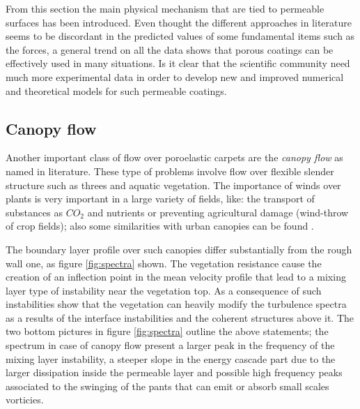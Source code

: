 From this section the main physical mechanism that are tied to permeable surfaces has been introduced.
Even thought the different approaches in literature seems to be discordant in the predicted values of some fundamental items such as the forces, a general trend on all the data shows that porous coatings can be effectively used in many situations.
Is it clear that the scientific community need much more experimental data in order to develop new and improved numerical and theoretical models for such permeable coatings.

\subsection{Canopy flow}

Another important class of flow over poroelastic carpets are the \textit{canopy flow} as named in literature.
These type of problems involve flow over flexible slender structure such as threes and aquatic vegetation.
The importance of winds over plants is very important in a large variety of fields, like: the transport of substances as $CO_2$ and nutrients or preventing agricultural damage (wind-throw of crop fields); also some similarities with urban canopies can be found \citet{ghisalberti2009obstructed}.

The boundary layer profile over such canopies differ substantially from the rough wall one, as figure \ref{fig:spectra} shown.
The vegetation resistance cause the creation of an inflection point in the mean velocity profile that lead to a mixing layer type of instability near the vegetation top.
As a consequence of such instabilities \citet{finnigan2000turbulence} show that the vegetation can heavily modify the turbulence spectra as a results of the interface instabilities and the coherent structures above it.
The two bottom pictures in figure \ref{fig:spectra} outline the above statements; the spectrum in case of canopy flow present a larger peak in the frequency of the mixing layer instability, a steeper slope in the energy cascade part due to the larger dissipation inside the permeable layer and possible high frequency peaks associated to the swinging of the pants that can emit or absorb small scales vorticies.
 
